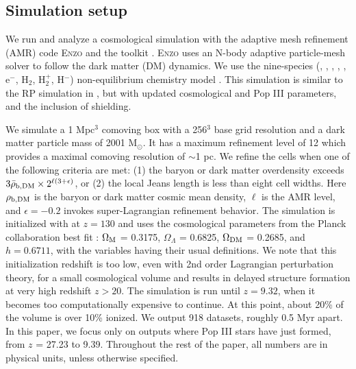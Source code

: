 \documentclass[fleqn,usenatbib]{mnras}
\begin{document}
\subsection{Simulation setup}
We run and analyze a cosmological simulation with the adaptive mesh refinement (AMR) code \textsc{Enzo} \citep{Enzo} and the toolkit \yt{} \citep{yt_full_paper}. \textsc{Enzo} uses an N-body adaptive particle-mesh solver \citep{Efstathiou85, Couchman91} to follow the dark matter (DM) dynamics. We use the nine-species (\hi, \hii, \hei, \heii, \heiii, e$^{-}$, H$_{2}$, H$_{2}^{+}$, H$^{-}$) non-equilibrium chemistry model \citep{Abel97, Anninos97}. This simulation is similar to the RP simulation in \citet[hereafter W12]{Wise12_RP}, but with updated cosmological and Pop III parameters, and the inclusion of \hh{} shielding.

We simulate a 1 Mpc$^{3}$ comoving box with a 256$^{3}$ base grid 
resolution and a dark matter particle mass of 2001 M$_{\odot}$. It has a maximum refinement level of 12 which provides a maximal comoving resolution of $\sim$1 pc.  We refine the cells when one of the following criteria are met: (1) the baryon or dark matter overdensity exceeds $3\bar{\rho}_{\rm b,DM} \times 2^{\ell(3+\epsilon)}$, or (2) the local Jeans length is less than eight cell widths.  Here $\rho_{\rm b,DM}$ is the baryon or dark matter cosmic mean density, $\ell$ is the AMR level, and $\epsilon = -0.2$ invokes super-Lagrangian refinement behavior. The simulation is initialized with \music{} \citep{Hahn11_MUSIC} at $z = 130$ and uses the cosmological parameters from the Planck collaboration best fit \citet{Planck13_Cosmo}: $\Omega_{\rm M}$ = 0.3175, $\Omega_{\Lambda}$ = 0.6825, $\Omega_{\rm DM}$ = 0.2685, and $h = 0.6711$, with the variables having their usual definitions. We note that this initialization redshift is too low, even with 2nd order Lagrangian perturbation theory, for a small cosmological volume and results in delayed structure formation at very high redshift $z > 20$. The simulation is run until $z = 9.32$, when it becomes too computationally expensive to continue. At this point, about 20\% of the volume is over 10\% ionized. We output 918 datasets,  roughly 0.5 Myr apart. In this paper, we focus only on outputs where Pop III stars have just formed, from $z$ = 27.23 to 9.39. Throughout the rest of the paper, all numbers are in physical units, unless otherwise specified.
\end{document}
